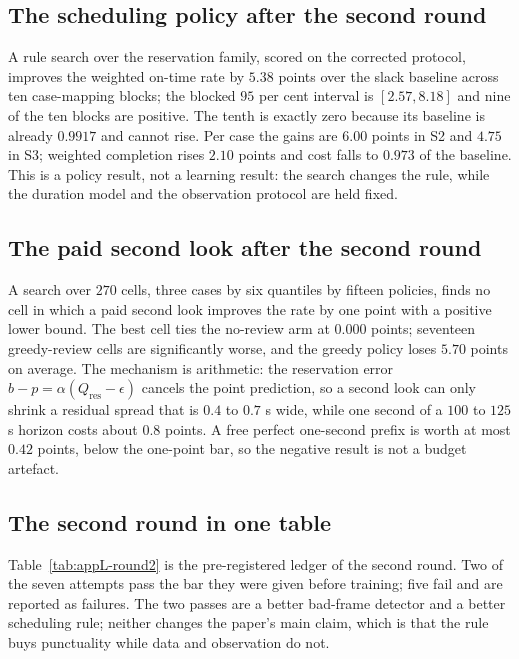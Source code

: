 \subsection*{The scheduling policy after the second round}
A rule search over the reservation family, scored on the corrected protocol,
improves the weighted on-time rate by $5.38$ points over the slack baseline across
ten case-mapping blocks; the blocked $95$ per cent interval is $[2.57, 8.18]$ and
nine of the ten blocks are positive. The tenth is exactly zero because its baseline
is already $0.9917$ and cannot rise. Per case the gains are $6.00$ points in S2 and
$4.75$ in S3; weighted completion rises $2.10$ points and cost falls to $0.973$ of
the baseline. This is a policy result, not a learning result: the search changes the
rule, while the duration model and the observation protocol are held fixed.

\subsection*{The paid second look after the second round}
A search over $270$ cells, three cases by six quantiles by fifteen policies, finds
no cell in which a paid second look improves the rate by one point with a positive
lower bound. The best cell ties the no-review arm at $0.000$ points; seventeen
greedy-review cells are significantly worse, and the greedy policy loses $5.70$
points on average. The mechanism is arithmetic: the reservation error
$b-p=\alpha(Q_{\mathrm{res}}-\epsilon)$ cancels the point prediction, so a second
look can only shrink a residual spread that is $0.4$ to $0.7$ s wide, while one
second of a $100$ to $125$ s horizon costs about $0.8$ points. A free perfect
one-second prefix is worth at most $0.42$ points, below the one-point bar, so the
negative result is not a budget artefact.

\subsection*{The second round in one table}
Table~\ref{tab:appL-round2} is the pre-registered ledger of the second round. Two of
the seven attempts pass the bar they were given before training; five fail and are
reported as failures. The two passes are a better bad-frame detector and a better
scheduling rule; neither changes the paper's main claim, which is that the rule buys
punctuality while data and observation do not.


